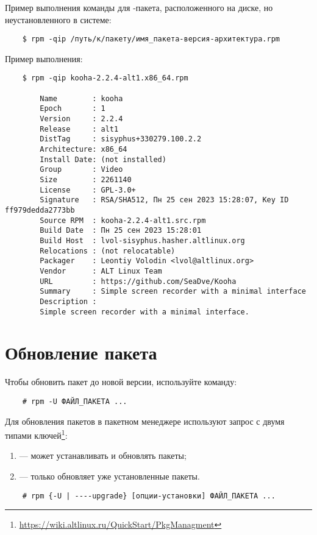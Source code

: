 Пример выполнения команды для -пакета, расположенного на диске, но неустановленного в системе:
\begin{verbatim}
    $ rpm -qip /путь/к/пакету/имя_пакета-версия-архитектура.rpm
\end{verbatim}

Пример выполнения:
\begin{verbatim}
    $ rpm -qip kooha-2.2.4-alt1.x86_64.rpm

        Name        : kooha
        Epoch       : 1
        Version     : 2.2.4
        Release     : alt1
        DistTag     : sisyphus+330279.100.2.2
        Architecture: x86_64
        Install Date: (not installed)
        Group       : Video
        Size        : 2261140
        License     : GPL-3.0+
        Signature   : RSA/SHA512, Пн 25 сен 2023 15:28:07, Key ID ff979dedda2773bb
        Source RPM  : kooha-2.2.4-alt1.src.rpm
        Build Date  : Пн 25 сен 2023 15:28:01
        Build Host  : lvol-sisyphus.hasher.altlinux.org
        Relocations : (not relocatable)
        Packager    : Leontiy Volodin <lvol@altlinux.org>
        Vendor      : ALT Linux Team
        URL         : https://github.com/SeaDve/Kooha
        Summary     : Simple screen recorder with a minimal interface
        Description :
        Simple screen recorder with a minimal interface.
\end{verbatim}

\section{Обновление пакета}
Чтобы обновить пакет до новой версии, используйте команду:
\begin{verbatim}
    # rpm -U ФАЙЛ_ПАКЕТА ...
\end{verbatim}

Для обновления пакетов в пакетном менеджере  используют запрос с двумя типами ключей\footnote{\href{https://wiki.altlinux.ru/QuickStart/PkgManagment}{https://wiki.altlinux.ru/QuickStart/PkgManagment}}:
\begin{enumerate}
	\item {} --- может устанавливать и обновлять пакеты;
	\item {} --- только обновляет уже установленные пакеты.
\end{enumerate}

\begin{verbatim}
    # rpm {-U | ----upgrade} [опции-установки] ФАЙЛ_ПАКЕТА ...
\end{verbatim}

